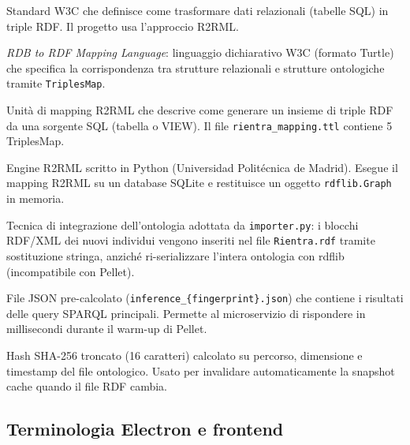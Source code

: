 \documentclass[a4paper,12pt]{article}
\begin{document}
\begin{description}[leftmargin=4cm, labelwidth=3.8cm, labelsep=0.2cm]

\item[\textbf{RDB2RDF}]
  Standard W3C che definisce come trasformare dati relazionali (tabelle SQL)
  in triple RDF. Il progetto usa l'approccio R2RML.

\item[\textbf{R2RML}]
  \textit{RDB to RDF Mapping Language}: linguaggio dichiarativo W3C (formato
  Turtle) che specifica la corrispondenza tra strutture relazionali e
  strutture ontologiche tramite \texttt{TriplesMap}.

\item[\textbf{TriplesMap}]
  Unit\`{a} di mapping R2RML che descrive come generare un insieme di triple
  RDF da una sorgente SQL (tabella o VIEW). Il file
  \texttt{rientra\_mapping.ttl} contiene 5 TriplesMap.

\item[\textbf{Morph-KGC}]
  Engine R2RML scritto in Python (Universidad Polit\'{e}cnica de Madrid).
  Esegue il mapping R2RML su un database SQLite e restituisce un
  oggetto \texttt{rdflib.Graph} in memoria.

\item[\textbf{Iniezione testuale}]
  Tecnica di integrazione dell'ontologia adottata da \texttt{importer.py}:
  i blocchi RDF/XML dei nuovi individui vengono inseriti nel file
  \texttt{Rientra.rdf} tramite sostituzione stringa, anzich\'{e}
  ri-serializzare l'intera ontologia con rdflib (incompatibile con Pellet).

\item[\textbf{Snapshot cache}]
  File JSON pre-calcolato (\texttt{inference\_\{fingerprint\}.json}) che
  contiene i risultati delle query SPARQL principali. Permette al
  microservizio di rispondere in millisecondi durante il warm-up di Pellet.

\item[\textbf{Fingerprint}]
  Hash SHA-256 troncato (16 caratteri) calcolato su percorso, dimensione e
  timestamp del file ontologico. Usato per invalidare automaticamente la
  snapshot cache quando il file RDF cambia.

\end{description}

\subsection*{Terminologia Electron e frontend}
\end{document}
